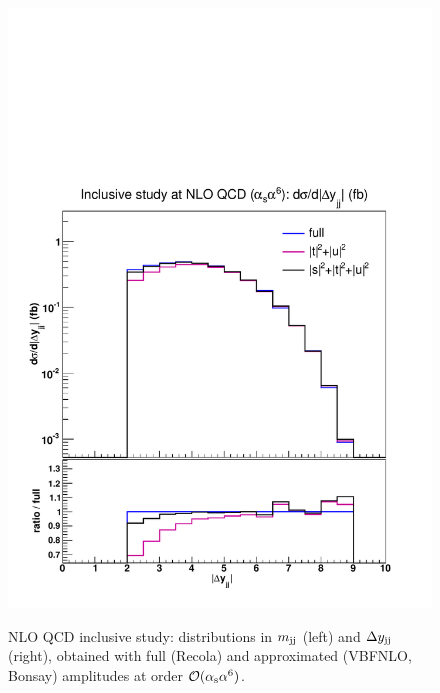 \begin{figure}[hbt]
{\includegraphics[scale=0.35]{figures/scanfigures/dyjj_nlo.pdf}}
\caption{NLO QCD inclusive study: distributions in $m_{\text{j}\text{j}}$ (left) and $\Delta y_{\text{j}\text{j}}$ (right), obtained with full ({\sc Recola}) and approximated ({\sc VBFNLO, Bonsay}) amplitudes at order $\mathcal{O}(\alpha_\text{s}\alpha^6)$.} \label{fig:mjjdyjj_1d_1}
\end{figure}


